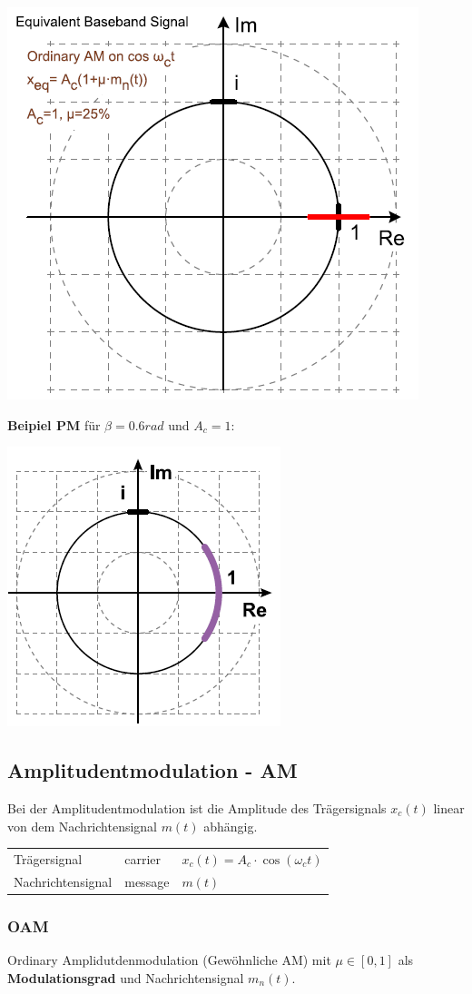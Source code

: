 \begin{center}
	\includegraphics[width=0.5\columnwidth]{Images/orinary_am_eq}
\end{center}


\noindent\textbf{Beipiel PM} für $\beta = 0.6rad$ und $A_c = 1$:
\begin{center}
	\includegraphics[width=0.5\columnwidth]{Images/phim_eq}
\end{center}

\subsection{Amplitudentmodulation - AM}\label{AM}
Bei der Amplitudentmodulation ist die Amplitude des Trägersignals $x_c(t)$ linear von dem Nachrichtensignal $m(t)$ abhängig.

\begin{tabular}{lll}
	Trägersignal & carrier & $x_c(t) = A_c \cdot \cos(\omega_ct)$ \\
	Nachrichtensignal & message & $m(t)$ \\
\end{tabular}


\subsubsection{OAM}
Ordinary Amplidutdenmodulation (Gewöhnliche AM) mit $\mu \in [0, 1]$ als \textbf{Modulationsgrad} und Nachrichtensignal $m_n(t)$. 

